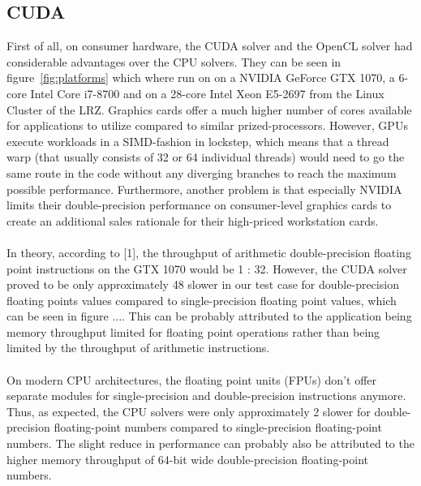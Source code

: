 \documentclass{article}%
\begin{document}
\subsection{CUDA}
First of all, on consumer hardware, the CUDA solver and the OpenCL solver had considerable advantages over the CPU solvers. They can be seen in figure~\ref{fig:platforms} which where run on on a NVIDIA GeForce GTX 1070, a 6-core Intel Core i7-8700 and on a 28-core Intel Xeon E5-2697 from the Linux Cluster of the LRZ. Graphics cards offer a much higher number of cores available for applications to utilize compared to similar prized-processors. However, GPUs execute workloads in a SIMD-fashion in lockstep, which means that a thread warp (that usually consists of 32 or 64 individual threads) would need to go the same route in the code without any diverging branches to reach the maximum possible performance. Furthermore, another problem is that especially NVIDIA limits their double-precision performance on consumer-level graphics cards to create an additional sales rationale for their high-priced workstation cards.\\
\\
In theory, according to [1], the throughput of arithmetic double-precision floating point instructions on the GTX 1070 would be 1 : 32. However, the CUDA solver proved to be only approximately 48\text{\%} slower in our test case for double-precision floating points values compared to single-precision floating point values, which can be seen in figure .... This can be probably attributed to the application being memory throughput limited for floating point operations rather than being limited by the throughput of arithmetic instructions.\\
\\
On modern CPU architectures, the floating point units (FPUs) don’t offer separate modules for single-precision and double-precision instructions anymore. Thus, as expected, the CPU solvers were only approximately 2\text{\%} slower for double-precision floating-point numbers compared to single-precision floating-point numbers. The slight reduce in performance can probably also be attributed to the higher memory throughput of 64-bit wide double-precision floating-point numbers.\\
\\
\end{document}
